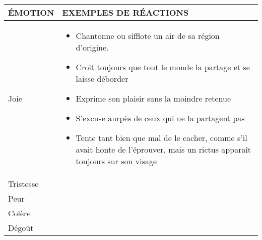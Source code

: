 \documentclass{article}
\author{}
\begin{document}
\title{\vspace{-0.5cm}{\Huge Exemples de réactions en fonction d'émotions} \vspace{-1cm}}

\date{}

\maketitle

\renewcommand{\arraystretch}{1.4}
\begin{center}
	\begin{tabular}{|p{4.5cm}|p{12cm}|}
		\hline 
		\cellcolor{DarkRed} {\large \textcolor{PureWhite}{\textbf{ÉMOTION}}} & \cellcolor{DarkRed} {\large \textcolor{PureWhite}{\textbf{EXEMPLES DE RÉACTIONS}}} \\
		\hline 
		Joie & \begin{itemize}
			\item Chantonne ou sifflote un air de sa région d'origine. 
			\item Croit toujours que tout le monde la partage et se laisse déborder
			\item Exprime son plaisir sans la moindre retenue
			\item S'excuse aurpès de ceux qui ne la partagent pas
			\item Tente tant bien que mal de le cacher, comme s'il avait honte de l'éprouver, mais un rictus apparaît toujours sur son visage
			\end{itemize} \\
		\hline 
		Tristesse &  \\
		\hline 
		Peur & \\
		\hline 
		Colère & \\
		\hline 
		Dégoût & \\
		\hline 
	\end{tabular}
\end{center}
\end{document}
